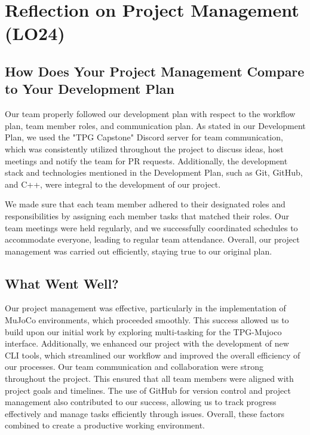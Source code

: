 \documentclass{article}
\begin{document}
\section{Reflection on Project Management (LO24)}


\subsection{How Does Your Project Management Compare to Your Development Plan}


Our team properly followed our development plan with respect to the workflow plan, team member roles, and communication plan. As stated in our Development Plan, we used the "TPG Capstone" Discord server for team communication, which was consistently utilized throughout the project to discuss ideas, host meetings and notify the team for PR requests. Additionally, the development stack and technologies mentioned in the Development Plan, such as Git, GitHub, and C++, were integral to the development of our project.

We made sure that each team member adhered to their designated roles and responsibilities by assigning each member tasks that matched their roles. Our team meetings were held regularly, and we successfully coordinated schedules to accommodate everyone, leading to regular team attendance. Overall, our project management was carried out efficiently, staying true to our original plan.


\subsection{What Went Well?}


Our project management was effective, particularly in the implementation of MuJoCo environments, which proceeded smoothly. This success allowed us to build upon our initial work by exploring multi-tasking for the TPG-Mujoco interface. Additionally, we enhanced our project with the development of new CLI tools, which streamlined our workflow and improved the overall efficiency of our processes. Our team communication and collaboration were strong throughout the project. This ensured that all team members were aligned with project goals and timelines. The use of GitHub for version control and project management also contributed to our success, allowing us to track progress effectively and manage tasks efficiently through issues. Overall, these factors combined to create a productive working environment.
\end{document}
